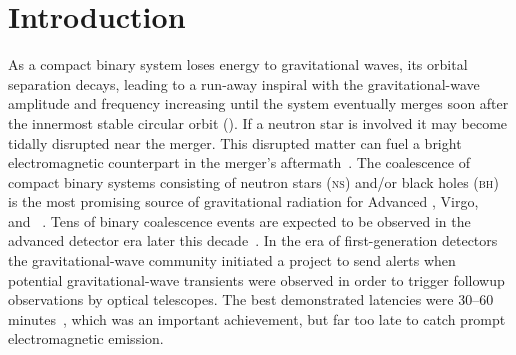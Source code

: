 \section{Introduction}
\label{sec:introduction}


As a compact binary system loses energy to gravitational waves, its orbital
separation decays, leading to a run-away inspiral with the
gravitational-wave amplitude and frequency increasing until the system
eventually merges soon after the innermost stable circular orbit (\ISCO). If a
neutron star is involved it may become tidally disrupted near the merger.  This
disrupted matter can fuel a bright electromagnetic counterpart in the merger's aftermath~\cite{shibata:2007}.
The coalescence of compact binary systems consisting of neutron stars
(\textsc{ns}) and/or black holes (\textsc{bh}) is the most promising source of
gravitational radiation for Advanced \LIGO, Virgo, \GEO\, and
\LCGT~\cite{ALIGOWeb, AVirgoWeb, GEOWeb, LCGTWeb}.  Tens of binary coalescence
events are expected to be observed in the advanced detector era later this
decade~\cite{Abadie:2010p10836}. In the era of first-generation
detectors the gravitational-wave community
initiated a project to send alerts when potential gravitational-wave transients
were observed in order to trigger followup observations by optical telescopes.
The best demonstrated latencies were 30--60 minutes~\cite{LOOCUP}, which was
an important achievement, but far too late to catch prompt electromagnetic emission.

